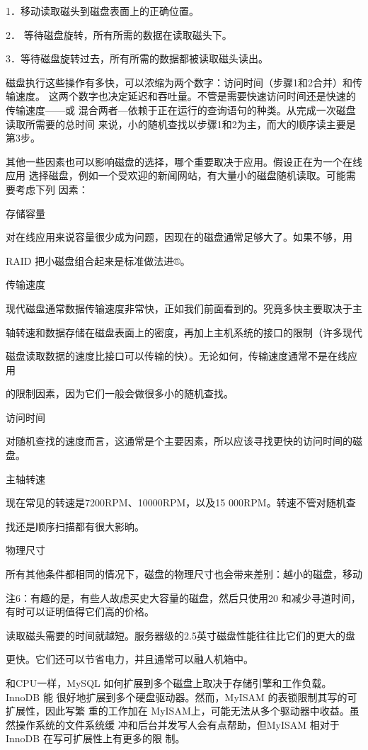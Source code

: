 1．移动读取磁头到磁盘表面上的正确位置。

2． 等待磁盘旋转，所有所需的数据在读取磁头下。

3．等待磁盘旋转过去，所有所需的数据都被读取磁头读出。

磁盘执行这些操作有多快，可以浓缩为两个数字：访问时间（步骤1和2合并）和传输速度。
这两个数字也决定延迟和吞吐量。不管是需要快速访问时间还是快速的传输速度——或
混合两者—依赖于正在运行的查询语句的种类。从完成一次磁盘读取所需要的总时间
来说，小的随机查找以步骤1和2为主，而大的顺序读主要是第3步。

其他一些因素也可以影响磁盘的选择，哪个重要取决于应用。假设正在为一个在线应用
选择磁盘，例如一个受欢迎的新闻网站，有大量小的磁盘随机读取。可能需要考虑下列
因素：

存储容量

对在线应用来说容量很少成为问题，因现在的磁盘通常足够大了。如果不够，用

RAID 把小磁盘组合起来是标准做法进®。

传输速度

现代磁盘通常数据传输速度非常快，正如我们前面看到的。究竟多快主要取决于主

轴转速和数据存储在磁盘表面上的密度，再加上主机系统的接口的限制（许多现代

磁盘读取数据的速度比接口可以传输的快）。无论如何，传输速度通常不是在线应用

的限制因素，因为它们一般会做很多小的随机查找。

访问时间

对随机查找的速度而言，这通常是个主要因素，所以应该寻找更快的访问时间的磁盘。

主轴转速

现在常见的转速是7200RPM、10000RPM，以及15 000RPM。转速不管对随机查

找还是顺序扫描都有很大影晌。

物理尺寸

所有其他条件都相同的情况下，磁盘的物理尺寸也会带来差别：越小的磁盘，移动

注6：有趣的是，有些人故虑买史大容量的磁盘，然后只使用20%
和减少寻道时间，有时可以证明值得它们高的价格。

读取磁头需要的时间就越短。服务器级的2.5英寸磁盘性能往往比它们的更大的盘

更快。它们还可以节省电力，并且通常可以融人机箱中。

和CPU一样，MySQL 如何扩展到多个磁盘上取决于存储引擎和工作负载。InnoDB 能
很好地扩展到多个硬盘驱动器。然而，MyISAM 的表锁限制其写的可扩展性，因此写繁
重的工作加在 MyISAM上，可能无法从多个驱动器中收益。虽然操作系统的文件系统缓
冲和后台并发写人会有点帮助，但MyISAM 相对于InnoDB 在写可扩展性上有更多的限
制。

